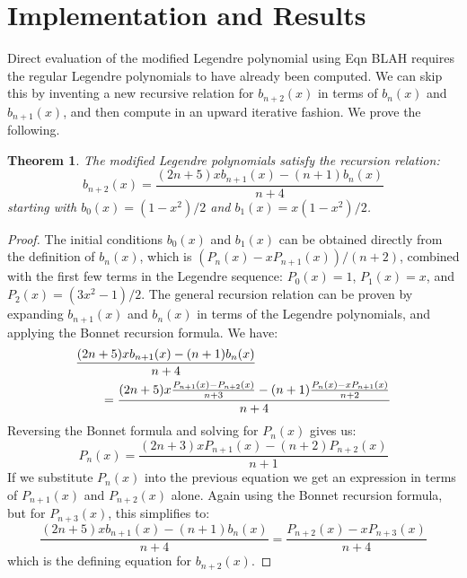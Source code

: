 \documentclass{article}
\theoremstyle{plain}
\newtheorem{theorem}{Theorem}
\begin{document}
    \section{Implementation and Results}
        Direct evaluation of the modified Legendre polynomial using Eqn BLAH
        requires the regular Legendre polynomials to have already been
        computed. We can skip this by inventing a new recursive relation
        for $b_{n+2}(x)$ in terms of $b_{n}(x)$ and $b_{n+1}(x)$, and then
        compute in an upward iterative fashion. We prove the following.
        \begin{theorem}
            \label{thm:modified_legendre_recursion}
            The modified Legendre polynomials satisfy the recursion relation:
            \begin{equation}
                b_{n+2}(x)=
                \frac{(2n+5)xb_{n+1}(x)-(n+1)b_{n}(x)}{n+4}
            \end{equation}
            starting with $b_{0}(x)=(1-x^{2})/2$ and $b_{1}(x)=x(1-x^{2})/2$.
        \end{theorem}
        \begin{proof}
            The initial conditions $b_{0}(x)$ and $b_{1}(x)$ can be obtained
            directly from the definition of $b_{n}(x)$, which is
            $(P_{n}(x)-xP_{n+1}(x))/(n+2)$, combined with the first few
            terms in the Legendre sequence: $P_{0}(x)=1$, $P_{1}(x)=x$, and
            $P_{2}(x)=(3x^{2}-1)/2$. The general recursion relation can be
            proven by expanding $b_{n+1}(x)$ and $b_{n}(x)$ in terms of the
            Legendre polynomials, and applying the Bonnet recursion formula.
            We have:
            \begin{equation}
                \begin{aligned}
                    &\frac{(2n+5)xb_{n+1}(x)-(n+1)b_{n}(x)}{n+4}\\
                    &\quad\quad=\frac{%
                        (2n+5)x\frac{P_{n+1}(x)-P_{n+2}(x)}{n+3}-
                        (n+1)\frac{P_{n}(x)-xP_{n+1}(x)}{n+2}
                    }{n+4}
                \end{aligned}
            \end{equation}
            Reversing the Bonnet formula and solving for $P_{n}(x)$ gives us:
            \begin{equation}
                P_{n}(x)=\frac{(2n+3)xP_{n+1}(x)-(n+2)P_{n+2}(x)}{n+1}
            \end{equation}
            If we substitute $P_{n}(x)$ into the previous equation we get an
            expression in terms of $P_{n+1}(x)$ and $P_{n+2}(x)$ alone.
            Again using the Bonnet recursion formula, but for $P_{n+3}(x)$,
            this simplifies to:
            \begin{equation}
                \frac{(2n+5)xb_{n+1}(x)-(n+1)b_{n}(x)}{n+4}
                =\frac{P_{n+2}(x)-xP_{n+3}(x)}{n+4}
            \end{equation}
            which is the defining equation for $b_{n+2}(x)$.
        \end{proof}
\end{document}

